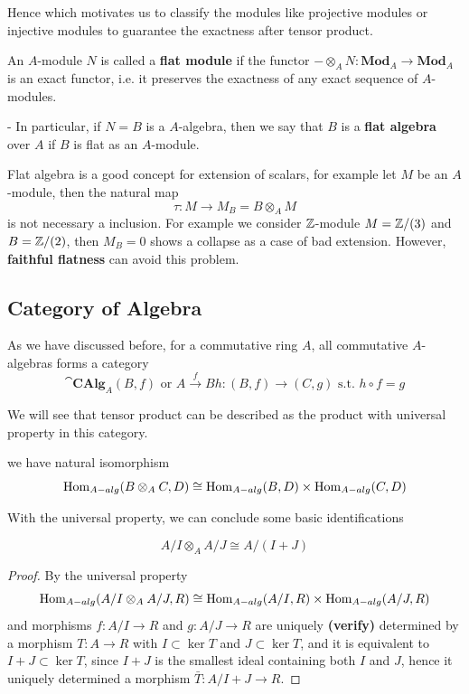 \documentclass[12pt,a4paper]{article}
\begin{document}
Hence which motivates us to classify the modules like projective modules or injective modules to guarantee the exactness after tensor product.

\begin{definition}
    An \(A\)-module \(N\) is called a \textbf{flat module} if the functor \(- \otimes_A N: \mathbf{Mod}_A \to \mathbf{Mod}_A\) is an exact functor, i.e. it preserves the exactness of any exact sequence of \(A\)-modules.

    - In particular, if \(N = B\) is a \(A\)-algebra, then we say that \(B\) is a \textbf{flat algebra} over \(A\) if \(B\) is flat as an \(A\)-module.
\end{definition}

Flat algebra is a good concept for extension of scalars, for example let \(M\) be an \(A\)-module, then the natural map
\[\tau: M \to M_B = B \otimes_A M\]
is not necessary a inclusion. For example we consider \(\mathbb{Z}\)-module \(M = \mathbb{Z}/(3)\) and \(B = \mathbb{Z}/(2)\), then \(M_B = 0\) shows a collapse as a case of bad extension. However, \textbf{faithful flatness} can avoid this problem.

\subsection*{Category of Algebra}

As we have discussed before, for a commutative ring \(A\), all commutative \(A\)-algebras forms a category
\[\cat{\mathbf{CAlg}_A}{(B,f) \text{ or } A \xrightarrow{f} B}{h:(B,f) \to (C,g) \text{ s.t. } h \circ f = g} \]

We will see that tensor product can be described as the product with universal property in this category.
\begin{proposition}
    we have natural isomorphism
    \[\operatorname{Hom}_{A-alg}(B \otimes_A C, D) \cong \operatorname{Hom}_{A-alg}(B,D) \times \operatorname{Hom}_{A-alg}(C,D)\]
\end{proposition}

With the universal property, we can conclude some basic identifications

\begin{claim}
    \[A/I \otimes_A A/J \cong A/(I+J) \]
\end{claim}
\begin{proof}
    By the universal property
    \[\operatorname{Hom}_{A-alg}(A/I\otimes_A A/J,R) \cong \operatorname{Hom}_{A-alg}(A/I,R) \times \operatorname{Hom}_{A-alg}(A/J,R)\]
    and morphisms \(f:A/I \to R\) and \(g:A/J \to R\) are uniquely \textbf{(verify)} determined by a morphism \(T:A \to R\) with \(I \subset \ker T\) and \(J \subset \ker T\), and it is equivalent to \(I+J \subset \ker T\), since \(I+J\) is the smallest ideal containing both \(I\) and \(J\), hence it uniquely determined a morphism \(\bar{T}: A/I+J \to R\).
\end{proof}
\end{document}
